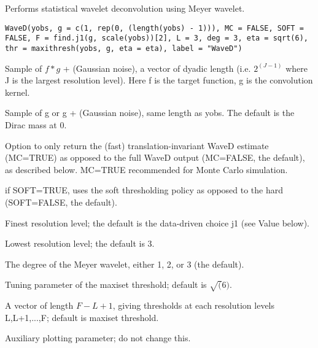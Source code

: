 \documentclass{article}
\begin{document}
\begin{Description}\relax
Performs statistical wavelet deconvolution using Meyer wavelet.
\end{Description}
\begin{Usage}
\begin{verbatim}
WaveD(yobs, g = c(1, rep(0, (length(yobs) - 1))), MC = FALSE, SOFT = FALSE, F = find.j1(g, scale(yobs))[2], L = 3, deg = 3, eta = sqrt(6), thr = maxithresh(yobs, g, eta = eta), label = "WaveD")
\end{verbatim}
\end{Usage}
\begin{Arguments}
\begin{ldescription}
\item[\code{yobs}] Sample of $f*g$ + (Gaussian noise), a vector of dyadic length 
(i.e. $2^(J-1)$ where J is the largest resolution level). 
Here f is the target function, g is the convolution kernel.
\item[\code{g}] Sample of g or g + (Gaussian noise), same length as yobs.
The default is the Dirac mass at 0.
\item[\code{MC}] Option to only return the (fast) translation-invariant WaveD estimate
(MC=TRUE) as opposed to the full WaveD output (MC=FALSE, the default), 
as described below. MC=TRUE recommended for Monte Carlo simulation.
\item[\code{SOFT}] if SOFT=TRUE, uses the soft thresholding policy as opposed to the
hard (SOFT=FALSE, the default).
\item[\code{F}] Finest resolution level; the default is the data-driven choice j1
(see Value below).
\item[\code{L}] Lowest resolution level; the default is 3.
\item[\code{deg}] The degree of the Meyer wavelet, either 1, 2, or 3 (the default).
\item[\code{eta}] Tuning parameter of the maxiset threshold; default is $\sqrt(6)$.
\item[\code{thr}] A vector of length $F-L+1$, giving thresholds at each resolution levels L,L+1,...,F; default is maxiset threshold.
\item[\code{label}] Auxiliary plotting parameter; do not change this.
\end{ldescription}
\end{Arguments}
\end{document}
